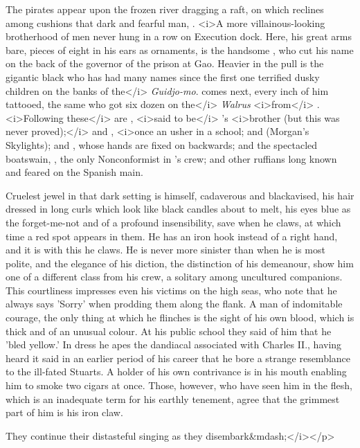 \begin{stagedir}
The pirates appear upon the frozen river dragging a raft,
on which reclines among cushions that dark and fearful man, \captjashook.
<i>A more villainous-looking brotherhood of men never hung in a row on Execution dock.
Here, his great arms bare, pieces of eight in his ears as ornaments, is the handsome \cecco, who cut his name on the back of the governor of the prison at Gao.
Heavier in the pull is the gigantic black who has had many names since the first one terrified dusky children on the banks of the</i> \emph{Guidjo-mo}.
\billjukes comes next, every inch of him tattooed, the same \jukes who got six dozen on the</i> \emph{Walrus} <i>from</i> \flint.
<i>Following these</i> are \cookson, <i>said to be</i> \blackmurphy's <i>brother (but this was never proved);</i> and \gentlemanstarkey, <i>once an usher in a school; and \skylights (Morgan's Skylights); and \noodler, whose hands are fixed on backwards; and the spectacled boatswain, \smee, the only Nonconformist in \hook's crew; and other ruffians long known and feared on the Spanish main.

Cruelest jewel in that dark setting is \hook himself, cadaverous and blackavised, his hair dressed in long curls which look like black candles about to melt, his eyes blue as the forget-me-not and of a profound insensibility, save when he claws, at which time a red spot appears in them.
He has an iron hook instead of a right hand, and it is with this he claws.
He is never more sinister than when he is most polite, and the elegance of his diction, the distinction of his demeanour, show him one of a different class from his crew, a solitary among uncultured companions.
This courtliness impresses even his victims on the high seas, who note that he always says 'Sorry' when prodding them along the flank.
A man of indomitable courage, the only thing at which he flinches is the sight of his own blood, which is thick and of an unusual colour.
At his public school they said of him that he 'bled yellow.'
In dress he apes the dandiacal associated with Charles II., having heard it said in an earlier period of his career that he bore a strange resemblance to the ill-fated Stuarts.
A holder of his own contrivance is in his mouth enabling him to smoke two cigars at once.
Those, however, who have seen him in the flesh, which is an inadequate term for his earthly tenement, agree that the grimmest part of him is his iron claw.

They continue their distasteful singing as they disembark&mdash;</i></p>
\end{stagedir}

